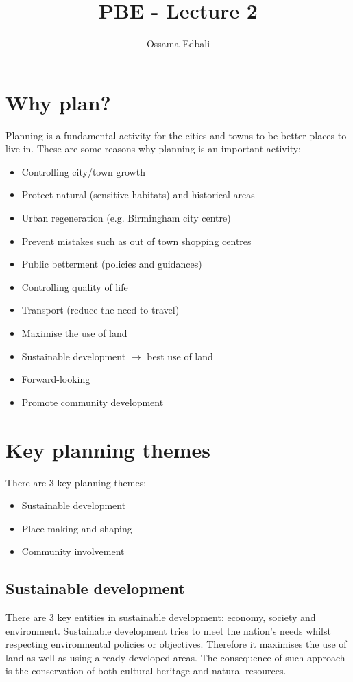 \documentclass{article}
\title{PBE - Lecture 2}
\author{Ossama Edbali}
\begin{document}
	
	\maketitle
	
	\section{Why plan?}
	Planning is a fundamental activity for the cities and towns to be better places to live in.
	These are some reasons why planning is an important activity:
	\begin{itemize}
		\item Controlling city/town growth
		\item Protect natural (sensitive habitats) and historical areas
		\item Urban regeneration (e.g. Birmingham city centre)
		\item Prevent mistakes such as out of town shopping centres
		\item Public betterment (policies and guidances)
		\item Controlling quality of life
		\item Transport (reduce the need to travel)
		\item Maximise the use of land
		\item Sustainable development $\rightarrow$ best use of land
		\item Forward-looking
		\item Promote community development
	\end{itemize}
	
	\section{Key planning themes}
	There are 3 key planning themes:
	\begin{itemize}
		\item Sustainable development
		\item Place-making and shaping
		\item Community involvement
	\end{itemize}
	
	\subsection*{Sustainable development}
	There are 3 key entities in sustainable development: economy, society and environment.
	Sustainable development tries to meet the nation's needs whilst respecting environmental
	policies or objectives.
	Therefore it maximises the use of land as well as using already developed areas. The consequence of
	such approach is the conservation of both cultural heritage and natural resources.
	
\end{document}
